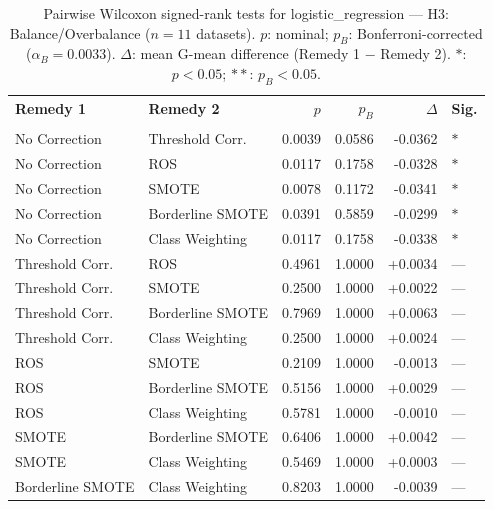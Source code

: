 \begin{table}[ht]
\centering
\scriptsize
\caption{Pairwise Wilcoxon signed-rank tests for logistic_regression --- H3: Balance/Overbalance ($n=11$ datasets). $p$: nominal; $p_B$: Bonferroni-corrected ($\alpha_B=0.0033$). $\Delta$: mean G-mean difference (Remedy 1 $-$ Remedy 2). $\ast$: $p<0.05$; $\ast\ast$: $p_B<0.05$.}
\label{tab:wilcoxon_logistic_regression_h3}
\begin{tabular}{llrrrl}
\toprule
\textbf{Remedy 1} & \textbf{Remedy 2} & \textbf{$p$} & \textbf{$p_B$} & \textbf{$\Delta$} &  \textbf{Sig.} \\\\
\midrule
    No Correction & Threshold Corr. & 0.0039 & 0.0586 & -0.0362 & $\ast$ \\
    No Correction & ROS & 0.0117 & 0.1758 & -0.0328 & $\ast$ \\
    No Correction & SMOTE & 0.0078 & 0.1172 & -0.0341 & $\ast$ \\
    No Correction & Borderline SMOTE & 0.0391 & 0.5859 & -0.0299 & $\ast$ \\
    No Correction & Class Weighting & 0.0117 & 0.1758 & -0.0338 & $\ast$ \\
    Threshold Corr. & ROS & 0.4961 & 1.0000 & +0.0034 & --- \\
    Threshold Corr. & SMOTE & 0.2500 & 1.0000 & +0.0022 & --- \\
    Threshold Corr. & Borderline SMOTE & 0.7969 & 1.0000 & +0.0063 & --- \\
    Threshold Corr. & Class Weighting & 0.2500 & 1.0000 & +0.0024 & --- \\
    ROS & SMOTE & 0.2109 & 1.0000 & -0.0013 & --- \\
    ROS & Borderline SMOTE & 0.5156 & 1.0000 & +0.0029 & --- \\
    ROS & Class Weighting & 0.5781 & 1.0000 & -0.0010 & --- \\
    SMOTE & Borderline SMOTE & 0.6406 & 1.0000 & +0.0042 & --- \\
    SMOTE & Class Weighting & 0.5469 & 1.0000 & +0.0003 & --- \\
    Borderline SMOTE & Class Weighting & 0.8203 & 1.0000 & -0.0039 & --- \\
\bottomrule
\end{tabular}
\end{table}